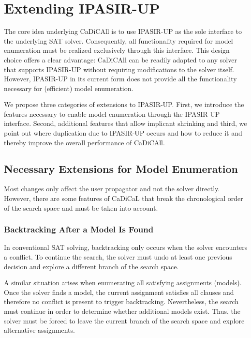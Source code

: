 \documentclass[12pt,a4paper]{article}
\begin{document}
\newpage

\section{Extending IPASIR-UP}
\label{sec:extending_ipasir_up}

The core idea underlying CaDiCAll is to use IPASIR-UP as the sole interface to the underlying SAT solver. Consequently, all functionality required for model enumeration must be realized exclusively through this interface. This design choice offers a clear advantage: CaDiCAll can be readily adapted to any solver that supports IPASIR-UP without requiring modifications to the solver itself. However, IPASIR-UP in its current form does not provide all the functionality necessary for (efficient) model enumeration.

We propose three categories of extensions to IPASIR-UP. First, we introduce the features necessary to enable model enumeration through the IPASIR-UP interface. Second, additional features that allow implicant shrinking and third, we point out where duplication due to IPASIR-UP occurs and how to reduce it and thereby improve the overall performance of CaDiCAll.

\subsection{Necessary Extensions for Model Enumeration}

Most changes only affect the user propagator and not the solver directly. However, there are some features of CaDiCaL that break the chronological order of the search space and must be taken into account.

\subsubsection{Backtracking After a Model Is Found}

In conventional SAT solving, backtracking only occurs when the solver encounters a conflict. To continue the search, the solver must undo at least one previous decision and explore a different branch of the search space.

A similar situation arises when enumerating all satisfying assignments (models). Once the solver finds a model, the current assignment satisfies all clauses and therefore no conflict is present to trigger backtracking. Nevertheless, the search must continue in order to determine whether additional models exist. Thus, the solver must be forced to leave the current branch of the search space and explore alternative assignments.
\end{document}
